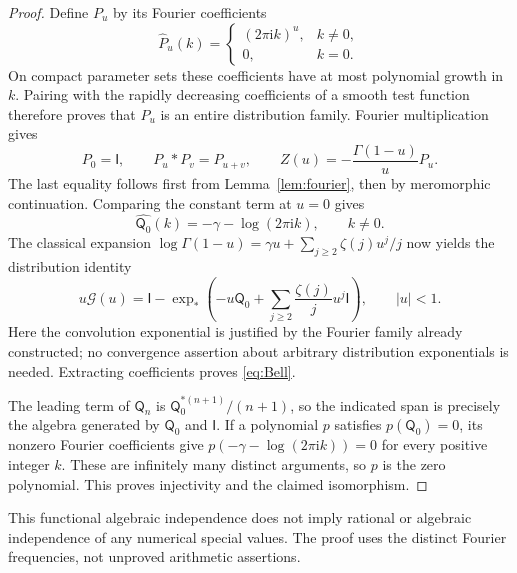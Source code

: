 \documentclass[11pt]{article}
\numberwithin{equation}{section}
\theoremstyle{definition}\newtheorem{definition}[theorem]{Definition}
\theoremstyle{remark}\newtheorem{remark}[theorem]{Remark}
\newcommand{\iu}{\mathrm i}
\newcommand{\qn}[1]{\mathsf Q_{#1}}
\newcommand{\id}{\mathsf I}
\newcommand{\calG}{\mathcal G}
\begin{document}
\begin{proof}
Define $P_u$ by its Fourier coefficients
\[
 \widehat P_u(k)=
 \begin{cases}(2\pi\iu k)^u,&k\ne0,\\0,&k=0.\end{cases}
\]
On compact parameter sets these coefficients have at most polynomial
growth in $k$. Pairing with the rapidly decreasing coefficients of a
smooth test function therefore proves that $P_u$ is an entire
distribution family. Fourier multiplication gives
\[
 P_0=\id,\qquad P_u*P_v=P_{u+v},\qquad
 Z(u)=-\frac{\Gamma(1-u)}u P_u.
\]
The last equality follows first from Lemma~\ref{lem:fourier}, then by
meromorphic continuation. Comparing the constant term at $u=0$ gives
\begin{equation}\label{eq:Q0fourier}
 \widehat{\qn0}(k)=-\gamma-\log(2\pi\iu k),\qquad k\ne0.
\end{equation}
The classical expansion
$\log\Gamma(1-u)=\gamma u+\sum_{j\ge2}\zeta(j)u^j/j$
now yields the distribution identity
\begin{equation}\label{eq:convolutionexp}
 u\calG(u)=\id-\exp_*\left(
 -u\qn0+\sum_{j\ge2}\frac{\zeta(j)}j u^j\id\right),\qquad |u|<1.
\end{equation}
Here the convolution exponential is justified by the Fourier family
already constructed; no convergence assertion about arbitrary
distribution exponentials is needed. Extracting coefficients proves
\eqref{eq:Bell}.

The leading term of $\qn n$ is $\qn0^{*(n+1)}/(n+1)$, so the indicated
span is precisely the algebra generated by $\qn0$ and $\id$. If a
polynomial $p$ satisfies $p(\qn0)=0$, its nonzero Fourier coefficients give
$p(-\gamma-\log(2\pi\iu k))=0$ for every positive integer $k$.
These are infinitely many distinct arguments, so $p$ is the zero
polynomial. This proves injectivity and the claimed isomorphism.
\end{proof}

This functional algebraic independence does not imply rational or
algebraic independence of any numerical special values. The proof uses
the distinct Fourier frequencies, not unproved arithmetic assertions.
\end{document}

